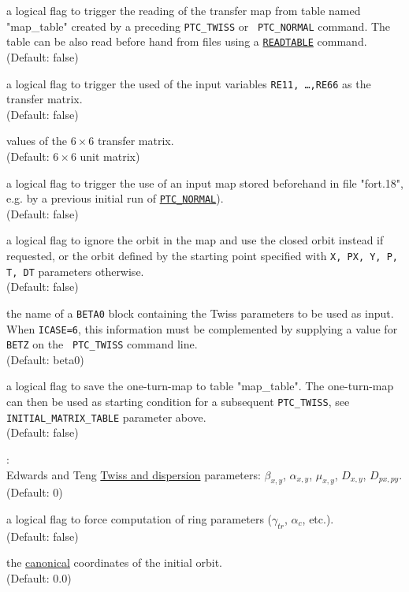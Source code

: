 \begin{madlist}
  a logical flag to trigger the reading of the transfer map from table
  named "map\_table" created by a preceding {\tt PTC\_TWISS} or {\tt
    PTC\_NORMAL} command. The table can be also read 
  before hand from files using a \hyperref[sec:readtable]{\tt READTABLE}
  command.\\ 
  (Default: false)
  
  a logical flag to trigger the used of the input variables {\tt RE11,
    \ldots ,RE66} as the transfer matrix. \\
  (Default: false)

  values of the $6\times 6$ transfer matrix. \\ 
  (Default: $6\times 6$ unit matrix) 
  
  a logical flag to trigger the use of an input map stored beforehand in
  file "fort.18",  e.g. by a previous initial run of
  \hyperref[chap:ptc_normal]{\tt PTC\_NORMAL}). \\
  (Default: false)

  a logical flag to ignore the orbit in the map and use the closed orbit
  instead if requested, or the orbit defined by the starting point
  specified with {\tt X, PX, Y, P, T, DT} parameters otherwise. \\
  (Default: false)

  the name of a {\tt BETA0} block containing the Twiss
  parameters to be used as input. When {\tt ICASE=6}, this information
  must be complemented by supplying a value for {\tt BETZ} on the {\tt
    PTC\_TWISS} command line. \\
  (Default: beta0)

  a logical flag to save the one-turn-map to table
  "map\_table". The one-turn-map can then be used as starting condition
  for a subsequent {\tt PTC\_TWISS}, see {\tt INITIAL\_MATRIX\_TABLE}
  parameter above. \\ (Default: false)

   : \\
  Edwards and Teng \cite{edwards1973} 
  \hyperref[chap:twiss]{Twiss and dispersion} parameters:  
  $\beta_{x,y}$, $\alpha_{x,y}$, $\mu_{x,y}$, $D_{x,y}$, $D_{px,py}$.\\
  (Default: 0) 

   a logical flag to force computation of ring
  parameters ($\gamma_{tr}$, $\alpha_c$, etc.). \\ 
  (Default: false)

   the
  \hyperref[subsec:tables_canon]{canonical} coordinates of the initial
  orbit. \\ (Default: 0.0) \\
  
\end{madlist}


